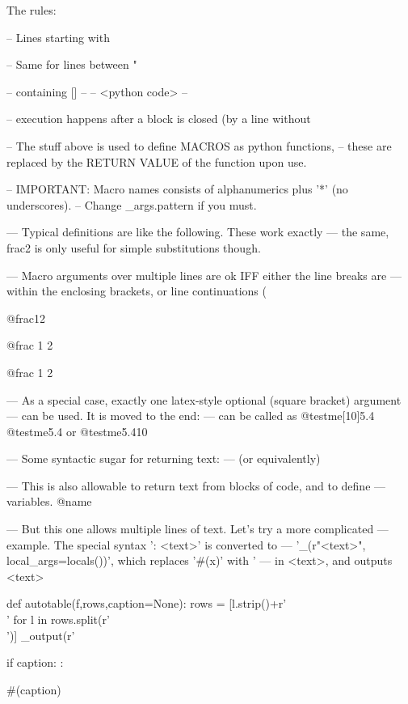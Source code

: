 The rules:

-- Lines starting with %

-- Same for lines between "{%
-- containing [{}]%
--  {%
--  <python code>
--  }%

-- execution happens after a block is closed (by a line without %

-- The stuff above is used to define MACROS as python functions,
-- these are replaced by the RETURN VALUE of the function upon use.

-- IMPORTANT: Macro names consists of alphanumerics plus '*' (no underscores).
-- Change _args.pattern if you must.

--- Typical definitions are like the following. These work exactly
--- the same, frac2 is only useful for simple substitutions though.




--- Macro arguments over multiple lines are ok IFF either the line breaks are
--- within the enclosing brackets, or line continuations (%

@frac{1}{2}

@frac  {1}  {2}

@frac{
1}%
{2}

--- As a special case, exactly one latex-style optional (square bracket) argument
--- can be used. It is moved to the end:
--- can be called as
@testme[10]{5.4}
@testme{5.4}
or
@testme{5.4}{10}

--- Some syntactic sugar for returning text:
--- (or equivalently)

--- This is also allowable to return text from blocks of code, and to define
--- variables.
@name


--- But this one allows multiple lines of text. Let's try a more complicated
--- example. The special syntax ': <text>' is converted to
--- '_(r"<text>", local_args=locals())', which replaces '#(x)' with '%
--- in <text>, and outputs <text>%
{%
def autotable(f,rows,caption=None):
    rows = [l.strip()+r'\\' for l in rows.split(r'\\')]
    _output(r'
    if caption:
        :\caption{#(caption)}
}%

}
